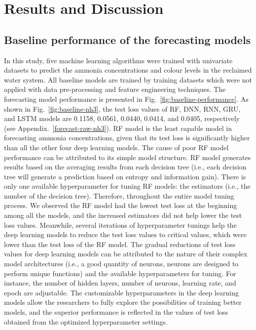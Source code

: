 \chapter{Results and Discussion}
\section{Baseline performance of the forecasting models}
In this study, five machine learning algorithms were trained with univariate datasets to predict the ammonia concentrations and colour levels in the reclaimed water system. All baseline models are trained by training datasets which were not applied with data pre-processing and feature engineering techniques. The forecasting model performance is presented in Fig.~\ref{fig:baseline-performance}. As shown in Fig.~\ref{fig:baseline-nh3}, the test loss values of RF, DNN, RNN, GRU, and LSTM models are 0.1158, 0.0561, 0.0440, 0.0414, and 0.0405, respectively (see Appendix.~\ref{forecast-raw-nh3}). RF model is the least capable model in forecasting ammonia concentrations, given that its test loss is significantly higher than all the other four deep learning models. The cause of poor RF model performance can be attributed to its simple model structure. RF model generates results based on the averaging results from each decision tree (i.e., each decision tree will generate a prediction based on entropy and information gain). There is only one available hyperparameter for tuning RF models: the estimators (i.e., the number of the decision tree). Therefore, throughout the entire model tuning process. We observed the RF model had the lowest test loss at the beginning among all the models, and the increased estimators did not help lower the test loss values. Meanwhile, several iterations of hyperparameter tunings help the deep learning models to reduce the test loss values to critical values, which were lower than the test loss of the RF model. The gradual reductions of test loss values for deep learning models can be attributed to the nature of their complex model architectures (i.e., a good quantity of neurons, neurons are designed to perform unique functions) and the available hyperparameters for tuning. For instance, the number of hidden layers, number of neurons, learning rate, and epoch are adjustable. The customizable hyperparameters in the deep learning models allow the researchers to fully explore the possibilities of training better models, and the superior performance is reflected in the values of test loss obtained from the optimized hyperparameter settings.
